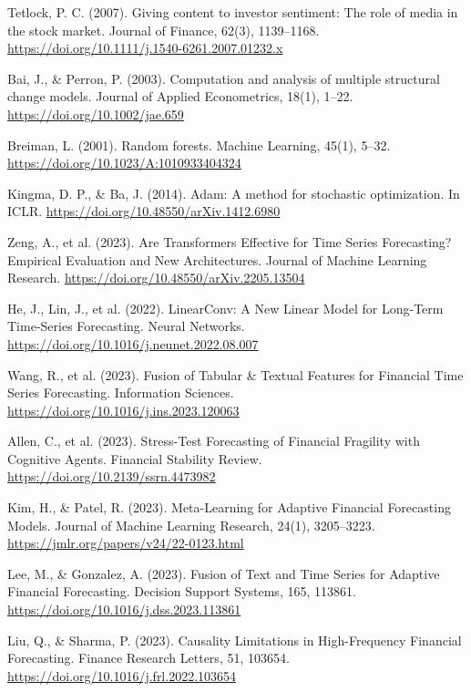 \documentclass[conference]{IEEEtran}
\begin{document}
\begin{thebibliography}{99}
 Tetlock, P. C. (2007). Giving content to investor sentiment: The role of media in the stock market. Journal of Finance, 62(3), 1139–1168. \url{https://doi.org/10.1111/j.1540-6261.2007.01232.x}

 Bai, J., & Perron, P. (2003). Computation and analysis of multiple structural change models. Journal of Applied Econometrics, 18(1), 1–22. \url{https://doi.org/10.1002/jae.659}

 Breiman, L. (2001). Random forests. Machine Learning, 45(1), 5–32. \url{https://doi.org/10.1023/A:1010933404324}

 Kingma, D. P., & Ba, J. (2014). Adam: A method for stochastic optimization. In ICLR. \url{https://doi.org/10.48550/arXiv.1412.6980}

 Zeng, A., et al. (2023). Are Transformers Effective for Time Series Forecasting? Empirical Evaluation and New Architectures. Journal of Machine Learning Research. \url{https://doi.org/10.48550/arXiv.2205.13504}

 He, J., Lin, J., et al. (2022). LinearConv: A New Linear Model for Long-Term Time-Series Forecasting. Neural Networks. \url{https://doi.org/10.1016/j.neunet.2022.08.007}

 Wang, R., et al. (2023). Fusion of Tabular \& Textual Features for Financial Time Series Forecasting. Information Sciences. \url{https://doi.org/10.1016/j.ins.2023.120063}

 Allen, C., et al. (2023). Stress-Test Forecasting of Financial Fragility with Cognitive Agents. Financial Stability Review. \url{https://doi.org/10.2139/ssrn.4473982}



 Kim, H., \& Patel, R. (2023). Meta-Learning for Adaptive Financial Forecasting Models. Journal of Machine Learning Research, 24(1), 3205–3223. \url{https://jmlr.org/papers/v24/22-0123.html}

 Lee, M., \& Gonzalez, A. (2023). Fusion of Text and Time Series for Adaptive Financial Forecasting. Decision Support Systems, 165, 113861. \url{https://doi.org/10.1016/j.dss.2023.113861}

 Liu, Q., \& Sharma, P. (2023). Causality Limitations in High-Frequency Financial Forecasting. Finance Research Letters, 51, 103654. \url{https://doi.org/10.1016/j.frl.2022.103654}


\end{thebibliography}
\end{document}
